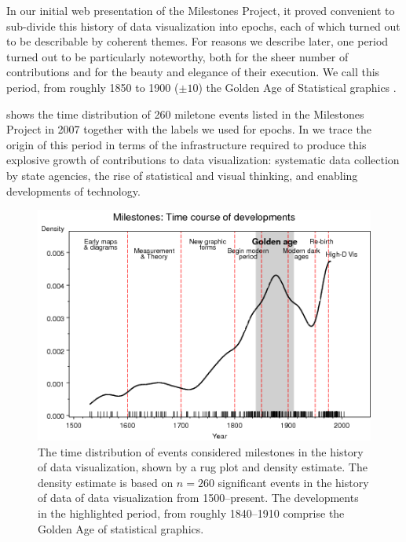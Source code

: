 In our initial web presentation of the Milestones Project, it proved convenient
to sub-divide this history of data visualization into epochs, each of which turned
out to be describable by coherent themes.  For reasons we describe later, one
period turned out to be particularly noteworthy, both for the sheer number of
contributions and for the beauty and elegance of their execution.
We call this period, from roughly 1850 to 1900 ($\pm 10$) the Golden Age of
Statistical graphics \citep{Friendly:2008:golden}.

 shows the time distribution of 260 miletone events
listed in the Milestones Project in 2007 together with the labels we used for
epochs.
In \citet{Friendly:2008:golden} we trace the origin of this period in terms
of the infrastructure required to produce this explosive growth of contributions
to data visualization: systematic data collection by state agencies,
the rise of statistical and visual thinking, and enabling  developments of
technology.
\begin{figure}[!htb]
  \centering
  \includegraphics[width=.9\textwidth,clip]{fig/mileyears4}
  \caption{The time distribution of events considered milestones in the history of
  data visualization, shown by a rug plot and
  density estimate.
  The density estimate is based on $n=260$ significant events in the history of data
  of data visualization from 1500--present.
  The developments in the highlighted period, from roughly 1840--1910 comprise the
  Golden Age of statistical graphics.
  }
  \label{fig:mileyears4}
\end{figure}


